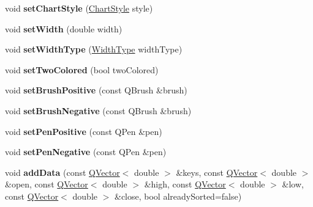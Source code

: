 \begin{DoxyCompactItemize}
\item 
\mbox{\label{class_q_c_p_financial_a5a59175d36279d71596e64d7bb65596f}} 
void {\bfseries set\+Chart\+Style} (\hyperlink{class_q_c_p_financial_a0f800e21ee98d646dfc6f8f89d10ebfb}{Chart\+Style} style)
\item 
\mbox{\label{class_q_c_p_financial_a99633f8bac86a61d534ae5eeb1a3068f}} 
void {\bfseries set\+Width} (double width)
\item 
\mbox{\label{class_q_c_p_financial_a204b7b710352796593a432b723e34089}} 
void {\bfseries set\+Width\+Type} (\hyperlink{class_q_c_p_financial_aef1761dda71a53dc5269685e9e492626}{Width\+Type} width\+Type)
\item 
\mbox{\label{class_q_c_p_financial_a138e44aac160a17a9676652e240c5f08}} 
void {\bfseries set\+Two\+Colored} (bool two\+Colored)
\item 
\mbox{\label{class_q_c_p_financial_a5ebff2b1764efd07cc44942e67821829}} 
void {\bfseries set\+Brush\+Positive} (const Q\+Brush \&brush)
\item 
\mbox{\label{class_q_c_p_financial_a8bbdd87629f9144b3ef51af660c0961a}} 
void {\bfseries set\+Brush\+Negative} (const Q\+Brush \&brush)
\item 
\mbox{\label{class_q_c_p_financial_ac58aa3adc7a35aab0088764b840683e5}} 
void {\bfseries set\+Pen\+Positive} (const Q\+Pen \&pen)
\item 
\mbox{\label{class_q_c_p_financial_afe5c07e94ccea01a75b3a2476993c346}} 
void {\bfseries set\+Pen\+Negative} (const Q\+Pen \&pen)
\item 
\mbox{\label{class_q_c_p_financial_a372ac031e44a7a6c912d203556af96f7}} 
void {\bfseries add\+Data} (const \hyperlink{class_q_vector}{Q\+Vector}$<$ double $>$ \&keys, const \hyperlink{class_q_vector}{Q\+Vector}$<$ double $>$ \&open, const \hyperlink{class_q_vector}{Q\+Vector}$<$ double $>$ \&high, const \hyperlink{class_q_vector}{Q\+Vector}$<$ double $>$ \&low, const \hyperlink{class_q_vector}{Q\+Vector}$<$ double $>$ \&close, bool already\+Sorted=false)

\end{DoxyCompactItemize}
